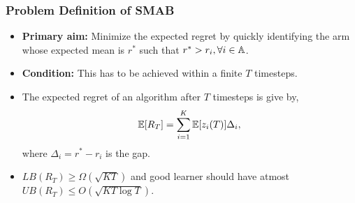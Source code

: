 




\begin{frame}
\frametitle{Problem Definition of SMAB}
\begin{itemize}
\item<1-> \textbf{Primary aim:} Minimize the expected regret by quickly identifying the arm whose expected mean is $r^*$ such that $r^* > r_i,\forall i\in\mathbb{A}$.
\item<2-> \textbf{Condition:} This has to be achieved within a finite $T$ timesteps.
\item<3-> The expected regret of an algorithm after $T$ timesteps is give by,
\begin{align*}
\mathbb{E}[R_{T}]= \sum_{i=1}^{K} \mathbb{E}[z_i (T)] \Delta_i,
\end{align*}
where $\Delta_{i}=r^{*}-r_{i}$ is the gap.
\item<4-> $LB(R_T) \geq \Omega\left( \sqrt{KT}\right)$ and good learner should have atmost $UB(R_T) \leq O\left( \sqrt{KT\log T}\right)$.
\end{itemize}
\end{frame}

%
%

